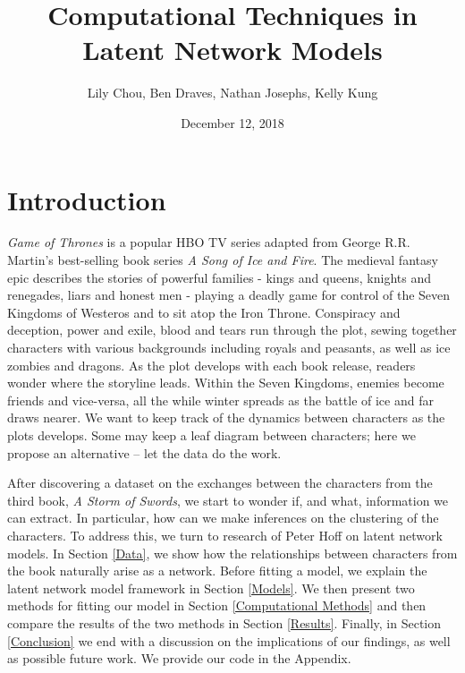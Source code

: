 \documentclass{article}
\title{Computational Techniques in Latent Network Models}
\author{Lily Chou, Ben Draves, Nathan Josephs, Kelly Kung}
\date{December 12, 2018}
\begin{document}
\maketitle

\section{Introduction}

\textit{Game of Thrones} is a popular HBO TV series adapted from George R.R. Martin's best-selling book series \textit{A Song of Ice and Fire}. The medieval fantasy epic describes the stories of powerful families - kings and queens, knights and renegades, liars and honest men - playing a deadly game for control of the Seven Kingdoms of Westeros and to sit atop the Iron Throne. Conspiracy and deception, power and exile, blood and tears run through the plot, sewing together characters with various backgrounds including royals and peasants, as well as ice zombies and dragons. As the plot develops with each book release, readers wonder where the storyline leads. Within the Seven Kingdoms, enemies become friends and vice-versa, all the while winter spreads as the battle of ice and far draws nearer. We want to keep track of the dynamics between characters as the plots develops. Some may keep a leaf diagram between characters; here we propose an alternative -- let the data do the work.

After discovering a dataset on the exchanges between the characters from the third book, \textit{A Storm of Swords}, we start to wonder if, and what, information we can extract. In particular, how can we make inferences on the clustering of the characters. To address this, we turn to research of Peter Hoff on latent network models. In Section \ref{Data}, we show how the relationships between characters from the book naturally arise as a network. Before fitting a model, we explain the latent network model framework in Section \ref{Models}. We then present two methods for fitting our model in Section \ref{Computational Methods} and then compare the results of the two methods in Section \ref{Results}. Finally, in Section \ref{Conclusion} we end with a discussion on the implications of our findings, as well as possible future work. We provide our code in the Appendix.
\end{document}
